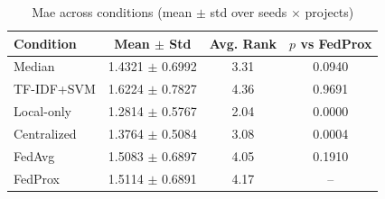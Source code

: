 \begin{table}[h]
\centering
\caption{Mae across conditions (mean $\pm$ std over seeds $\times$ projects)}
\begin{tabular}{lccc}
\toprule
Condition & Mean $\pm$ Std & Avg. Rank & $p$ vs FedProx \\
\midrule
Median & 1.4321 $\pm$ 0.6992 & 3.31 & 0.0940 \\
TF-IDF+SVM & 1.6224 $\pm$ 0.7827 & 4.36 & 0.9691 \\
Local-only & 1.2814 $\pm$ 0.5767 & 2.04 & 0.0000 \\
Centralized & 1.3764 $\pm$ 0.5084 & 3.08 & 0.0004 \\
FedAvg & 1.5083 $\pm$ 0.6897 & 4.05 & 0.1910 \\
FedProx & 1.5114 $\pm$ 0.6891 & 4.17 & -- \\
\bottomrule
\end{tabular}
\end{table}
